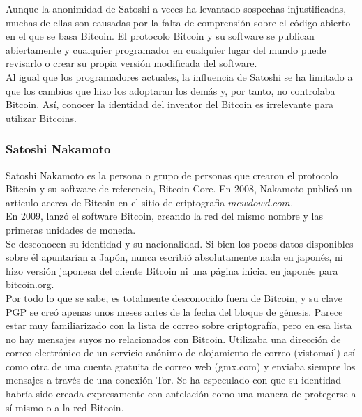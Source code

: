 \documentclass[12pt,letterpaper]{article}
\begin{document}
Aunque la anonimidad de Satoshi a veces ha levantado sospechas injustificadas, muchas de ellas son causadas por la falta de comprensi\'on sobre el c\'odigo abierto en el que se basa Bitcoin. El protocolo Bitcoin y su software se publican abiertamente y cualquier programador en cualquier lugar del mundo puede revisarlo o crear su propia versi\'on modificada del software. 
\\

Al igual que los programadores actuales, la influencia de Satoshi se ha limitado a que los cambios que hizo los adoptaran los dem\'as y, por tanto, no controlaba Bitcoin. As\'i, conocer la identidad del inventor del Bitcoin es irrelevante para utilizar Bitcoins.
\\
            
                \subsubsection*{Satoshi Nakamoto}
Satoshi Nakamoto es la persona o grupo de personas que crearon el protocolo Bitcoin y su software de referencia, Bitcoin Core. 
En 2008, Nakamoto public\'o un articulo acerca de Bitcoin en el sitio de criptografia $mewdowd.com$. 
\\

En 2009, lanz\'o el software Bitcoin, creando la red del mismo nombre y las primeras unidades de moneda.
\\

Se desconocen su identidad y su nacionalidad. Si bien los pocos datos disponibles sobre \'el apuntar\'ian a Jap\'on, nunca escribi\'o absolutamente nada en japon\'es, ni hizo versi\'on japonesa del cliente Bitcoin ni una p\'agina inicial en japon\'es para bitcoin.org.
\\

Por todo lo que se sabe, es totalmente desconocido fuera de Bitcoin, y su clave PGP se cre\'o apenas unos meses antes de la fecha del bloque de g\'enesis. Parece estar muy familiarizado con la lista de correo sobre criptograf\'ia, pero en esa lista no hay mensajes suyos no relacionados con Bitcoin. Utilizaba una direcci\'on de correo electr\'onico de un servicio an\'onimo de alojamiento de correo (vistomail) as\'i como otra de una cuenta gratuita de correo web (gmx.com) y enviaba siempre los mensajes a trav\'es de una conexi\'on Tor. Se ha especulado con que su identidad habr\'ia sido creada expresamente con antelaci\'on como una manera de protegerse a s\'i mismo o a la red Bitcoin. 
\end{document}
